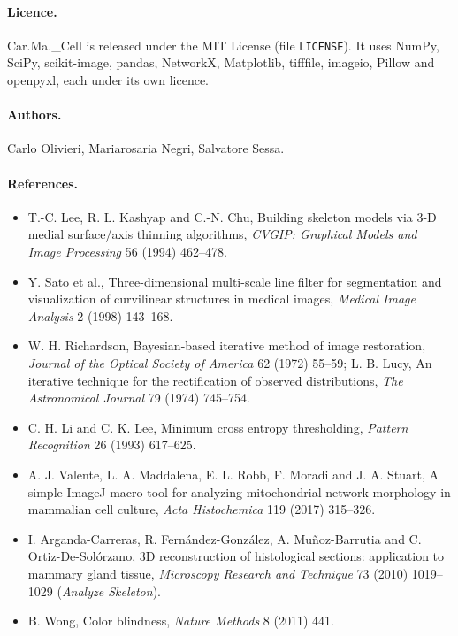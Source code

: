 \documentclass[fontsize=10.5pt,paper=a4,parskip=half,headings=normal,numbers=noenddot,
  open=any,captions=tableheading]{scrreprt}
\newcommand{\prog}{Car.Ma.\_Cell}
\newcommand{\file}[1]{\texttt{#1}}
\begin{document}
\paragraph{Licence.} \prog{} is released under the MIT License (file \file{LICENSE}). It uses NumPy, SciPy, scikit-image, pandas, NetworkX, Matplotlib, tifffile, imageio, Pillow and openpyxl, each under its own licence.

\paragraph{Authors.} Carlo Olivieri, Mariarosaria Negri, Salvatore Sessa.

\paragraph{References.}
\begin{itemize}
\item T.-C. Lee, R. L. Kashyap and C.-N. Chu, Building skeleton models via 3-D medial surface/axis thinning algorithms, \emph{CVGIP: Graphical Models and Image Processing} 56 (1994) 462--478.
\item Y. Sato et al., Three-dimensional multi-scale line filter for segmentation and visualization of curvilinear structures in medical images, \emph{Medical Image Analysis} 2 (1998) 143--168.
\item W. H. Richardson, Bayesian-based iterative method of image restoration, \emph{Journal of the Optical Society of America} 62 (1972) 55--59; L. B. Lucy, An iterative technique for the rectification of observed distributions, \emph{The Astronomical Journal} 79 (1974) 745--754.
\item C. H. Li and C. K. Lee, Minimum cross entropy thresholding, \emph{Pattern Recognition} 26 (1993) 617--625.
\item A. J. Valente, L. A. Maddalena, E. L. Robb, F. Moradi and J. A. Stuart, A simple ImageJ macro tool for analyzing mitochondrial network morphology in mammalian cell culture, \emph{Acta Histochemica} 119 (2017) 315--326.
\item I. Arganda-Carreras, R. Fernández-González, A. Muñoz-Barrutia and C. Ortiz-De-Solórzano, 3D reconstruction of histological sections: application to mammary gland tissue, \emph{Microscopy Research and Technique} 73 (2010) 1019--1029 (\emph{Analyze Skeleton}).
\item B. Wong, Color blindness, \emph{Nature Methods} 8 (2011) 441.
\end{itemize}
\end{document}
